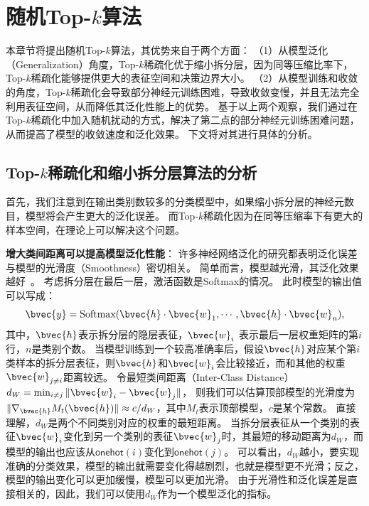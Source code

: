 \section{随机Top-$k$算法}
\label{sec:randomized_topk:method}
本章节将提出随机Top-$k$算法，其优势来自于两个方面：
（1）从模型泛化（Generalization）角度，Top-$k$稀疏化优于缩小拆分层，因为同等压缩比率下，Top-$k$稀疏化能够提供更大的表征空间和决策边界大小。
（2）从模型训练和收敛的角度，Top-$k$稀疏化会导致部分神经元训练困难，导致收敛变慢，并且无法完全利用表征空间，从而降低其泛化性能上的优势。
%
基于以上两个观察，我们通过在Top-$k$稀疏化中加入随机扰动的方式，解决了第二点的部分神经元训练困难问题，从而提高了模型的收敛速度和泛化效果。
%
下文将对其进行具体的分析。

\subsection{Top-$k$稀疏化和缩小拆分层算法的分析}
首先，我们注意到在输出类别数较多的分类模型中，如果缩小拆分层的神经元数目，模型将会产生更大的泛化误差。
而Top-$k$稀疏化因为在同等压缩率下有更大的样本空间，在理论上可以解决这个问题。


\textbf{增大类间距离可以提高模型泛化性能}：
许多神经网络泛化的研究都表明泛化误差与模型的光滑度（Smoothness）密切相关。
%
简单而言，模型越光滑，其泛化效果越好~\cite{neysharbur2015norm_capacity,neysharbur2017generalization,gouk2021lipschitz_reg}。
%
考虑拆分层在最后一层，激活函数是Softmax的情况。
此时模型的输出值可以写成：
\begin{equation}
    \bvec{y} = \text{Softmax}(\bvec{h}\cdot \bvec{w}_1, \cdots, \bvec{h} \cdot \bvec{w}_n),
\end{equation}
其中，$\bvec{h}$表示拆分层的隐层表征，$\bvec{w}_i$ 表示最后一层权重矩阵的第$i$行，$n$是类别个数。
%
当模型训练到一个较高准确率后，假设$\bvec{h}$对应某个第$i$类样本的拆分层表征，则$\bvec{h}$和$\bvec{w}_i$会比较接近，而和其他的权重$\bvec{w}_{j\ne i}$距离较远。
%
令最短类间距离（Inter-Class Distance）$d_W = \min_{i\ne j} \Vert \bvec{w}_i - \bvec{w}_j \Vert$，
则我们可以估算顶部模型的光滑度为$\Vert \nabla_{\bvec{h}} M_t(\bvec{h}) \Vert \approx c/d_W$，其中$M_t$表示顶部模型，$c$是某个常数。
%
直接理解，$d_W$是两个不同类别对应的权重的最短距离。
当拆分层表征从一个类别的表征$\bvec{w}_i$变化到另一个类别的表征$\bvec{w}_j$时，其最短的移动距离为$d_W$，而模型的输出也应该从$\mathsf{onehot}(i)$变化到$\mathsf{onehot}(j)$。
%
可以看出，$d_W$越小，要实现准确的分类效果，模型的输出就需要变化得越剧烈，也就是模型更不光滑；反之，模型的输出变化可以更加缓慢，模型可以更加光滑。
%
由于光滑性和泛化误差是直接相关的，因此，我们可以使用$d_W$作为一个模型泛化的指标。
%


